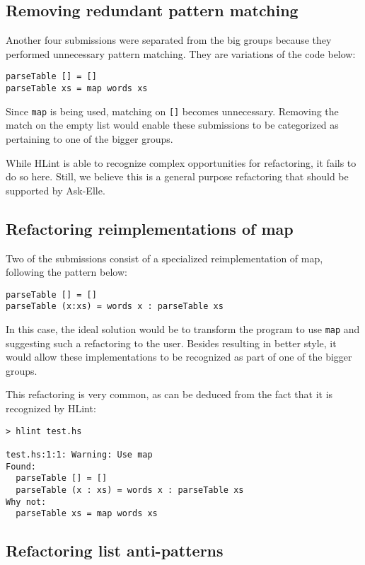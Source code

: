 \subsection{Removing redundant pattern matching}

Another four submissions were separated from the big groups because they performed unnecessary pattern matching. They are variations of the code below:

\begin{verbatim}
parseTable [] = []
parseTable xs = map words xs
\end{verbatim}

Since \texttt{map} is being used, matching on \texttt{[]} becomes unnecessary. Removing the match on the empty list would enable these submissions to be categorized as pertaining to one of the bigger groups.

While HLint is able to recognize complex opportunities for refactoring, it fails to do so here. Still, we believe this is a general purpose refactoring that should be supported by Ask-Elle.

\subsection{Refactoring reimplementations of map}

Two of the submissions consist of a specialized reimplementation of map, following the pattern below:

\begin{verbatim}
parseTable [] = []
parseTable (x:xs) = words x : parseTable xs
\end{verbatim}

In this case, the ideal solution would be to transform the program to use \texttt{map} and suggesting such a refactoring to the user. Besides resulting in better style, it would allow these implementations to be recognized as part of one of the bigger groups.

This refactoring is very common, as can be deduced from the fact that it is recognized by HLint:

\begin{lstlisting}
> hlint test.hs

test.hs:1:1: Warning: Use map
Found:
  parseTable [] = []
  parseTable (x : xs) = words x : parseTable xs
Why not:
  parseTable xs = map words xs
\end{lstlisting}

\subsection{Refactoring list anti-patterns}

